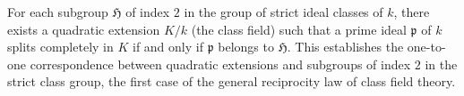 For each subgroup $\mathfrak{H}$ of index $2$ in the group of strict ideal classes of $k$, there exists a quadratic extension $K/k$ (the class field) such that a prime ideal $\mathfrak{p}$ of $k$ splits completely in $K$ if and only if $\mathfrak{p}$ belongs to $\mathfrak{H}$. This establishes the one-to-one correspondence between quadratic extensions and subgroups of index $2$ in the strict class group, the first case of the general reciprocity law of class field theory.
